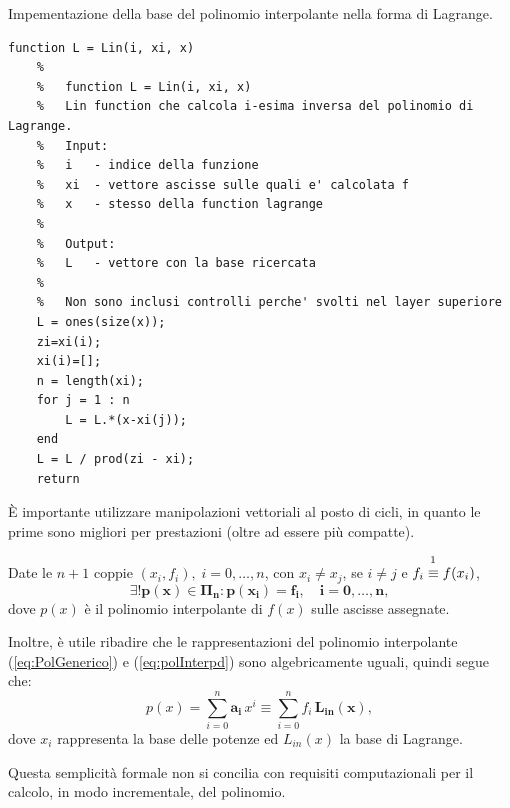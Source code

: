 \begin{algorithm}
\caption{Impementazione della base del polinomio interpolante nella forma di Lagrange.}\label{alg:implBasePolIntFormaLagr}
    \begin{lstlisting}[style=Matlab-editor]
    function L = Lin(i, xi, x)
    %
    %   function L = Lin(i, xi, x)
    %   Lin function che calcola i-esima inversa del polinomio di Lagrange.
    %   Input:
    %   i   - indice della funzione
    %   xi  - vettore ascisse sulle quali e' calcolata f
    %   x   - stesso della function lagrange
    %
    %   Output:
    %   L   - vettore con la base ricercata
    %
    %   Non sono inclusi controlli perche' svolti nel layer superiore
    L = ones(size(x));
    zi=xi(i);
    xi(i)=[];
    n = length(xi);
    for j = 1 : n
        L = L.*(x-xi(j));
    end
    L = L / prod(zi - xi);
    return
    \end{lstlisting}
\end{algorithm}

È importante utilizzare manipolazioni vettoriali al posto di cicli, in quanto le prime sono migliori per prestazioni (oltre ad essere più compatte).

Date le $n+1$ coppie $(x_i,f_i),\; i=0,\hdots,n$, con $x_i\neq x_j$, se $i\neq j$ e $f_i\overset{\footnotemark}{\equiv} f(x_i)$,
\begin{equation*}
    \boldsymbol{\exists!p(x)\in\Pi_n:p(x_i)=f_i,\quad i=0,\hdots, n},
\end{equation*}
dove $p(x)$ è il polinomio interpolante di $f(x)$ sulle ascisse assegnate.

Inoltre, è utile ribadire che le rappresentazioni del polinomio interpolante (\ref{eq:PolGenerico}) e (\ref{eq:polInterpd}) sono algebricamente uguali, quindi segue che: 
\begin{equation}\label{eq:equivBasi}
p(x)=\sum_{i=0}^n \boldsymbol{a_i}\, x^i \equiv \sum_{i=0}^n f_i\, \boldsymbol{L_{in}(x)},
\end{equation}
dove $x_i$ rappresenta la base delle potenze ed $L_{in}(x)$ la base di Lagrange.

Questa semplicità formale non si concilia con requisiti computazionali per il calcolo, in modo incrementale, del polinomio.


